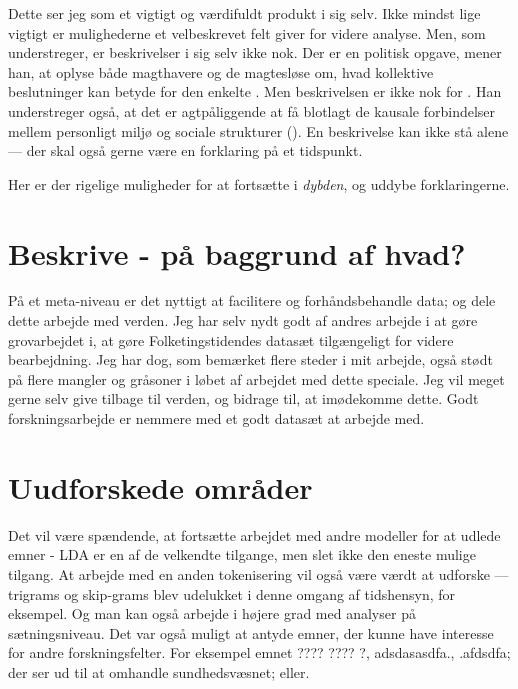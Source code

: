 Dette ser jeg som et vigtigt og værdifuldt produkt i sig selv.
Ikke mindst lige vigtigt er mulighederne et velbeskrevet felt giver for videre analyse.
Men, som \citeauthor{millsSociologicalImagination2000} understreger, er beskrivelser i sig selv ikke nok.
Der er en politisk opgave, mener han, at oplyse både magthavere og de magtesløse om, hvad kollektive beslutninger kan betyde for den enkelte \autocite[s. ]{millsSociologicalImagination2000}.
Men beskrivelsen er ikke nok for \citeauthor{millsSociologicalImagination2000}.
Han understreger også, at det er agtpåliggende at få blotlagt de kausale forbindelser mellem personligt miljø og sociale strukturer (\citeyear[s. 130]{millsSociologicalImagination2000}).
En beskrivelse kan ikke stå alene — der skal også gerne være en forklaring på et tidspunkt.

Her er der rigelige muligheder for at fortsætte i \textit{dybden}, og uddybe forklaringerne.

\section{Beskrive - på baggrund af hvad?}
På et meta-niveau er det nyttigt at facilitere og forhåndsbehandle data; og dele dette arbejde med verden.
Jeg har selv nydt godt af andres arbejde i at gøre grovarbejdet i, at gøre Folketingstidendes datasæt tilgængeligt for videre bearbejdning.
Jeg har dog, som bemærket flere steder i mit arbejde, også stødt på flere mangler og gråsoner i løbet af arbejdet med dette speciale.
Jeg vil meget gerne selv give tilbage til verden, og bidrage til, at imødekomme dette.
Godt forskningsarbejde er nemmere med et godt datasæt at arbejde med.

\section{Uudforskede områder}

Det vil være spændende, at fortsætte arbejdet med andre modeller for at udlede emner - LDA er en af de velkendte tilgange, men slet ikke den eneste mulige tilgang.
At arbejde med en anden tokenisering vil også være værdt at udforske — trigrams og skip-grams blev udelukket i denne omgang af tidshensyn, for eksempel. Og man kan også arbejde i højere grad med analyser på sætningsniveau.
Det var også muligt at antyde emner, der kunne have interesse for andre forskningsfelter.
For eksempel emnet ???? ???? ?, adsdasasdfa., .afdsdfa; der ser ud til at omhandle sundhedsvæsnet; eller.

